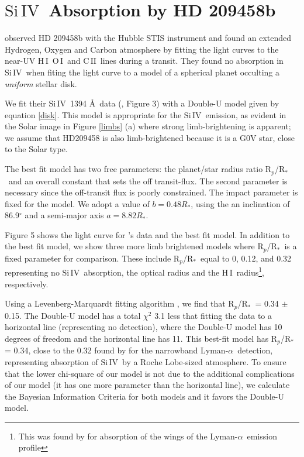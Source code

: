 \documentclass[manuscript]{aastex}
\newcommand{\cii}{\ensuremath{\mathrm{C}\,\scriptstyle \mathrm{II}}}
\newcommand{\oi}{\ensuremath{\mathrm{O}\,\scriptstyle \mathrm{I}}}
\newcommand{\hi}{\ensuremath{\mathrm{H}\,\scriptstyle \mathrm{I}}}
\newcommand{\siIV}{\ensuremath{\mathrm{Si}\,\scriptstyle \mathrm{IV}}}
\newcommand{\p}{R$_p$/R$_*$}
\newcommand{\lya}{Lyman-$\alpha$}
\begin{document}
\section{\siIV\ Absorption by HD 209458b} \label{osiris}

\citet{viddisc} observed HD 209458b with the Hubble STIS instrument and found
an extended Hydrogen, Oxygen and Carbon atmosphere by fitting the light curves
to the near-UV \hi\, \oi\ and \cii\ lines during a transit. They found no absorption in \siIV\ when fiting the light curve to a model of a spherical planet occulting a {\it uniform} stellar disk.

We fit their \siIV\ 1394 \AA\ data (\citet{vidmad}, Figure 3) with a Double-U model given by equation \ref{disk}. This model is appropriate for the \siIV\ emission, as evident in the Solar image in Figure \ref{limbs} (a) where strong limb-brightening is apparent; we assume that HD209458 is also limb-brightened because it is a G0V star, close to the Solar type.

The best fit model has two free parameters: the planet/star radius ratio \p\ and an overall constant that sets the off transit-flux. The second parameter is necessary since the off-transit flux is poorly constrained. The impact parameter 
 is fixed for the model. We adopt a value of $ b= 0.48 R_*$, using the an inclination of 86.9$^\circ$ \citep{knutsonprop} and a semi-major axis $a=8.82 R_*$.

Figure 5
 shows the light curve for \citet{vidmad}'s data and the best fit model. In addition to the best fit model, we show three more limb brightened models where \p\ is a fixed parameter for comparison. These include \p\ equal to 0, 0.12, and 0.32 representing no \siIV\ absorption, the optical radius \citep{knutsonprop} and the \hi\ radius\footnote{This was found by \citet{vidmad} for absorption of the wings of the \lya\ emission profile}, respectively.

Using a Levenberg-Marquardt fitting algorithm \citep{mpfit}, we find that \p\ = 0.34 $\pm$ 0.15. 
The Double-U model has a total $\chi^2$ 3.1 less that fitting the data to
a horizontal line (representing no detection), where the Double-U model has 10 degrees of freedom and the horizontal line has 11. This best-fit model has
R$_p$/R$_*$ = 0.34, close to the 0.32 found by \citet{vidmad} for the narrowband \lya\ detection, representing absorption of \siIV\ by a Roche Lobe-sized atmosphere. To ensure that the lower chi-square of our model is not due to the additional complications of our model (it has one more parameter than the horizontal line), we calculate the Bayesian Information Criteria for both models and it favors the Double-U model.
\end{document}
